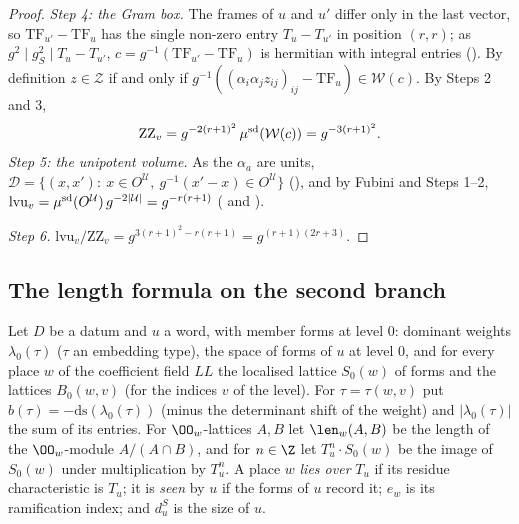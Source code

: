 \begin{proof}
\emph{Step 4: the Gram box.} The frames of $u$ and $u'$ differ only in the last vector, so $\mathrm{TF}_{u'}-\mathrm{TF}_u$ has the
single non-zero entry $T_u-T_{u'}$ in position $(r,r)$; as $g^2\mid g_S^2\mid T_u-T_{u'}$, $c=g^{-1}(\mathrm{TF}_{u'}-\mathrm{TF}_u)$
is hermitian with integral entries (). By definition
$z\in\mathcal Z$ if and only if $g^{-1}((\alpha_i\alpha_jz_{ij})_{ij}-\mathrm{TF}_u)\in\mathcal W(c)$. By Steps 2 and 3,
\[
\mathrm{ZZ}_v=g^{-2(r+1)^2}\,\mu^{\mathrm{sd}}(\mathcal W(c))=g^{-3(r+1)^2}.
\]
\emph{Step 5: the unipotent volume.} As the $\alpha_a$ are units, $\mathcal D=\{(x,x'):\ x\in O^{\mathcal U},\ g^{-1}(x'-x)\in
O^{\mathcal U}\}$ (), and by Fubini and Steps 1--2,
$\mathrm{lvu}_v=\mu^{\mathrm{sd}}(O^{\mathcal U})\,g^{-2|\mathcal U|}=g^{-r(r+1)}$
( and ).

\emph{Step 6.} $\mathrm{lvu}_v/\mathrm{ZZ}_v=g^{3(r+1)^2-r(r+1)}=g^{(r+1)(2r+3)}$.
\end{proof}


\subsection{The length formula on the second branch}\label{sec:pf:sh-siegel:branch}

Let $D$ be a datum and $u$ a word, with member forms at level $0$: dominant weights $\lambda_0(\tau)$ ($\tau$ an embedding type),
the space of forms of $u$ at level $0$, and for every place $w$ of the coefficient field $\mathit{LL}$ the localised lattice
$S_0(w)$ of forms and the lattices $B_0(w,v)$ (for the indices $v$ of the level). For $\tau=\tau(w,v)$ put
$b(\tau)=-\mathrm{ds}(\lambda_0(\tau))$ (minus the determinant shift of the weight) and $|\lambda_0(\tau)|$ the sum of its entries.
For $\OO_w$-lattices $A,B$ let $\len_w(A,B)$ be the length of the $\OO_w$-module $A/(A\cap B)$, and for $n\in\Z$ let
$T_u^n\cdot S_0(w)$ be the image of $S_0(w)$ under multiplication by $T_u^n$. A place $w$ \emph{lies over} $T_u$ if its residue
characteristic is $T_u$; it is \emph{seen} by $u$ if the forms of $u$ record it; $e_w$ is its ramification index; and $d^S_u$ is
the size of $u$.

